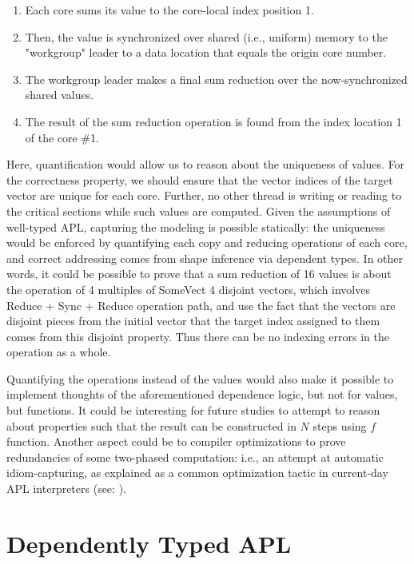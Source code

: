 \documentclass{report}
\begin{document}
\begin{enumerate}
    \item Each core sums its value to the core-local index position 1.
    \item Then, the value is synchronized over shared (i.e., uniform) memory to the "workgroup" leader to a data location that equals the origin core number.
    \item The workgroup leader makes a final sum reduction over the now-synchronized shared values.
    \item The result of the sum reduction operation is found from the index location 1 of the core \#1.
\end{enumerate}

Here, quantification would allow us to reason about the uniqueness of values. For the correctness property, we should ensure that the vector indices of the target vector are unique for each core. Further, no other thread is writing or reading to the critical sections while such values are computed. Given the assumptions of well-typed APL, capturing the modeling is possible statically: the uniqueness would be enforced by quantifying each copy and reducing operations of each core, and correct addressing comes from shape inference via dependent types. In other words, it could be possible to prove that a sum reduction of 16 values is about the operation of 4 multiples of SomeVect 4 disjoint vectors, which involves Reduce + Sync + Reduce operation path, and use the fact that the vectors are disjoint pieces from the initial vector that the target index assigned to them comes from this disjoint property. Thus there can be no indexing errors in the operation as a whole.

Quantifying the operations instead of the values would also make it possible to implement thoughts of the aforementioned dependence logic, but not for values, but functions. It could be interesting for future studies to attempt to reason about properties such that the result can be constructed in $N$ steps using $f$ function. Another aspect could be to compiler optimizations to prove redundancies of some two-phased computation: i.e., an attempt at automatic idiom-capturing, as explained as a common optimization tactic in current-day APL interpreters (see: \cite{hui2020apl}).

\section{Dependently Typed APL}
\label{sc:dependentapl}
\end{document}
